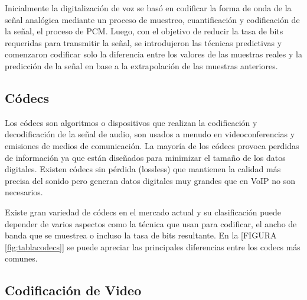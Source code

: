 		
Inicialmente la digitalización de voz se basó en codificar la forma 
de onda de la señal analógica mediante un proceso de muestreo, 
cuantificación y codificación de la señal, el proceso de PCM. Luego, con el objetivo de reducir la tasa de bits requeridas para transmitir la señal, se introdujeron las técnicas predictivas y comenzaron codificar solo la diferencia entre los valores de las muestras reales y la predicción de la señal en base a la extrapolación de las muestras anteriores. 

\subsection{Códecs}

Los códecs son algoritmos o dispositivos que realizan la codificación y 
decodificación de la señal de audio, son usados a menudo en videoconferencias y emisiones de medios de comunicación. La 
mayoría de los códecs provoca perdidas de información ya que 
están diseñados para minimizar el tamaño de los datos digitales. 
Existen códecs sin pérdida (lossless) que mantienen la calidad 
más precisa del sonido pero generan datos digitales muy grandes 
que en VoIP no son necesarios. 

Existe gran variedad de códecs en el mercado actual y su clasificación puede depender de varios aspectos como la técnica que usan para codificar, el ancho de banda que se muestrea o incluso la tasa de bits resultante. En la [FIGURA \ref{fig:tablacodecs}] se puede apreciar las principales diferencias entre los codecs más comunes.


\subsection{Codificación de Video}

	